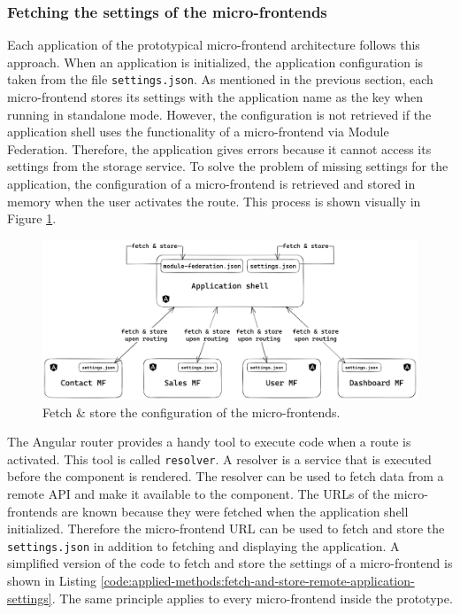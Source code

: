 \subsubsection{Fetching the settings of the micro-frontends}\label{subsubsection:applied-methods:prototypical-implementation
:load-the-configuration}

Each application of the prototypical micro-frontend architecture follows this approach. When an application is initialized, the application configuration is taken from the file \texttt{settings.json}. As mentioned in the previous section, each micro-frontend stores its settings with the application name as the key when running in standalone mode. However, the configuration is not retrieved if the application shell uses the functionality of a micro-frontend via Module Federation. Therefore, the application gives errors because it cannot access its settings from the storage service. To solve the problem of missing settings for the application, the configuration of a micro-frontend is retrieved and stored in memory when the user activates the route. This process is shown visually in Figure \ref{fig:applied-methods:load-remote-settings}.

\ifshowImages
  \begin{figure}[H]
  \centering
  \includegraphics[width=0.9\linewidth]{images/applied-methods/prototypical-implementation/load-remote-settings.png}
  \caption{Fetch \& store the configuration of the micro-frontends.}\label{fig:applied-methods:load-remote-settings}
  \end{figure}
\fi

\noindent The Angular router provides a handy tool to execute code when a route is activated. This tool is called \texttt{resolver}. A resolver is a service that is executed before the component is rendered. The resolver can be used to fetch data from a remote \ac{API} and make it available to the component. \cite{misc:-:applied-methods:micro-frontends:angular-router-resolver} The \acp{URL} of the micro-frontends are known because they were fetched when the application shell initialized. Therefore the micro-frontend \ac{URL} can be used to fetch and store the \texttt{settings.json} in addition to fetching and displaying the application. A simplified version of the code to fetch and store the settings of a micro-frontend is shown in Listing \ref{code:applied-methods:fetch-and-store-remote-application-settings}. The same principle applies to every micro-frontend inside the prototype.

